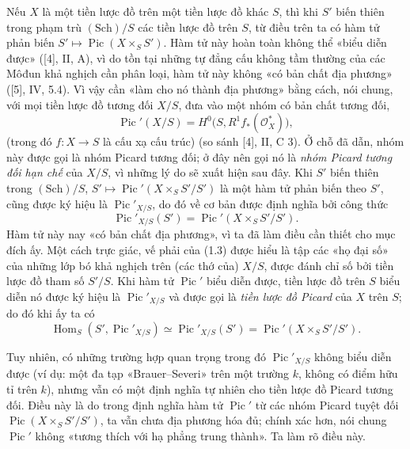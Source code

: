 Nếu $X$ là một tiền lược đồ trên một tiền lược đồ khác $S$, thì khi $S'$ biến
thiên trong phạm trù $(\mathrm{Sch})/S$ các tiền lược đồ trên $S$, từ điều trên
ta có hàm tử phản biến
$S'\longmapsto\operatorname{Pic}(X\times_S S')$. Hàm tử này hoàn toàn không
thể «biểu diễn được» ([4], II, A), vì do tồn tại những tự đẳng cấu không tầm
thường của các Môđun khả nghịch cần phân loại, hàm tử này không «có bản chất
địa phương» ([5], IV, 5.4). Vì vậy cần «làm cho nó thành địa phương» bằng cách,
nói chung, với mọi tiền lược đồ tương đối $X/S$, đưa vào một nhóm có bản chất
tương đối,
\begin{equation}
\operatorname{Pic}'(X/S)=H^0\bigl(S,R^1f_*(\mathcal O_X^*)\bigr),
\tag{1.2}
\end{equation}
(trong đó $f:X\longrightarrow S$ là cấu xạ cấu trúc) (so sánh [4], II,
C 3). Ở chỗ đã dẫn, nhóm này được gọi là nhóm Picard tương đối; ở đây nên gọi
nó là \emph{nhóm Picard tương đối hạn chế} của $X/S$, vì những lý do sẽ xuất
hiện sau đây. Khi $S'$ biến thiên trong $(\mathrm{Sch})/S$,
$S'\longmapsto\operatorname{Pic}'(X\times_S S'/S')$ là một hàm tử phản biến
theo $S'$, cũng được ký hiệu là $\operatorname{Pic}'_{X/S}$, do đó về cơ bản
được định nghĩa bởi công thức
\begin{equation}
\operatorname{Pic}'_{X/S}(S')=
\operatorname{Pic}'(X\times_S S'/S').
\tag{1.3}
\end{equation}
Hàm tử này nay «có bản chất địa phương», vì ta đã làm điều cần thiết cho mục
đích ấy. Một cách trực giác, vế phải của (1.3) được hiểu là tập các «họ đại số»
của những lớp bó khả nghịch trên (các thớ của) $X/S$, được đánh chỉ số bởi tiền
lược đồ tham số $S'/S$. Khi hàm tử $\operatorname{Pic}'$ biểu diễn được, tiền
lược đồ trên $S$ biểu diễn nó được ký hiệu là $\operatorname{Pic}'_{X/S}$ và
được gọi là \emph{tiền lược đồ Picard} của $X$ trên $S$; do đó khi ấy ta có
\begin{equation}
\operatorname{Hom}_S(S',\operatorname{Pic}'_{X/S})
\simeq\operatorname{Pic}'_{X/S}(S')
=\operatorname{Pic}'(X\times_S S'/S').
\tag{1.4}
\end{equation}

Tuy nhiên, có những trường hợp quan trọng trong đó
$\operatorname{Pic}'_{X/S}$ không biểu diễn được (ví dụ: một đa tạp
«Brauer--Severi» trên một trường $k$, không có điểm hữu tỉ trên $k$), nhưng vẫn
có một định nghĩa tự nhiên cho tiền lược đồ Picard tương đối. Điều này là do
trong định nghĩa hàm tử $\operatorname{Pic}'$ từ các nhóm Picard tuyệt đối
$\operatorname{Pic}(X\times_S S'/S')$, ta vẫn chưa địa phương hóa đủ; chính
xác hơn, nói chung $\operatorname{Pic}'$ không «tương thích với hạ phẳng trung
thành». Ta làm rõ điều này.

